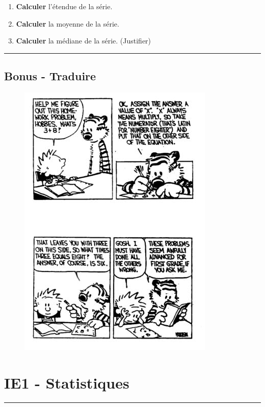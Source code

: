 \documentclass[12pt]{article}
\newcommand{\horrule}[1]{\rule{\linewidth}{#1}} %
\begin{document}
\begin{multicols}{2}
\begin{enumerate}
\item[1.] \textbf{Calculer} l'étendue de la série.
\item[2.] \textbf{Calculer} la moyenne de la série.
\item[3.] \textbf{Calculer} la médiane de la série. (Justifier)
\end{enumerate}

\horrule{1px}
\subsection*{Bonus - Traduire}

\begin{figure}[H]
	\centering
	\includegraphics[width=0.7 \linewidth]{3x1-statistiques/sources/cah.jpg}
\end{figure}
\end{multicols}

\newpage

\section*{IE1 - Statistiques}
\horrule{2px}
\end{document}
